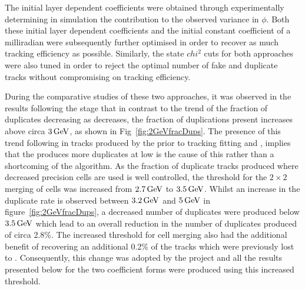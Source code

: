 The initial layer dependent coefficients were obtained through experimentally determining in simulation the \MS contribution to the observed variance in $\phi$.
Both these initial layer dependent coefficients and the initial constant coefficient of a milliradian were subsequently further optimised in order to recover as much tracking efficiency as  possible.
Similarly, the \KF state $chi^{2}$ cuts for both approaches were also tuned in order to reject the optimal number of fake and duplicate tracks without compromising on tracking efficiency.

During the comparative studies of these two approaches, it was observed in the results following the \DR stage that in contrast to the trend of the fraction of duplicates decreasing as \pT decreases, the fraction of duplications present increases above circa $3\,\text{Ge\hspace{-.08em}V}$, as shown in Fig~\ref{fig:2GeVfracDups}.
The presence of this trend following in tracks produced by the \HT prior to tracking fitting and \DR, implies that the \HT produces more duplicates at low \pT is the cause of this rather than a shortcoming of the \DR algorithm.
As the fraction of duplicate tracks produced where decreased precision \HT cells are used is well controlled, the \pT threshold for the $2 \times 2$ merging of \HT cells was increased from $2.7\,\text{Ge\hspace{-.08em}V}$ to $3.5\,\text{Ge\hspace{-.08em}V}$.
Whilst an increase in the duplicate rate is observed between $3.2\,\text{Ge\hspace{-.08em}V}$ and $5\,\text{Ge\hspace{-.08em}V}$ in figure~\ref{fig:2GeVfracDups}, a decreased number of duplicates were produced below $3.5\,\text{Ge\hspace{-.08em}V}$ which lead to an overall reduction in the number of duplicates produced of circa 2.8\%.
The increased \pT threshold for \HT cell merging also had the additional benefit of recovering an additional 0.2\% of the tracks which were previously lost to \MS.
Consequently, this change was adopted by the project and all the results presented below for the two \MS coefficient forms were produced using this increased threshold. 

